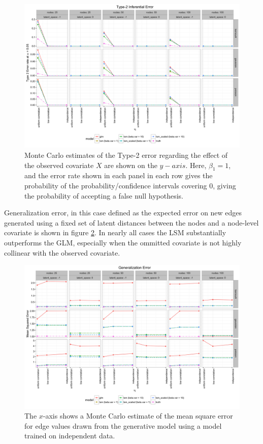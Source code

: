 \documentclass[12pt]{article}
\begin{document}
\begin{figure}
\includegraphics[width=\textwidth]{inference_type_2.png}
\caption{Monte Carlo estimates of the Type-2 error regarding the effect of the observed covariate $X$ are shown on the $y-axis$. Here, $\beta_1 = 1$, and the error rate shown in each panel in each row gives the probability of the probability/confidence intervals covering $0$, giving the probability of accepting a false null hypothesis. \label{fig:inference_type_2}}
\end{figure}

Generalization error, in this case defined as the expected error on new edges generated using a fixed set of latent distances between the nodes and a node-level covariate is shown in figure \ref{fig:generalization}. In nearly all cases the LSM substantially outperforms the GLM, especially when the ommitted covariate is not highly collinear with the observed covariate.

\begin{figure}
\includegraphics[width=\textwidth]{generalization.png}
\caption{The $x$-axis shows a Monte Carlo estimate of the mean square error for edge values drawn from the generative model using a model trained on independent data. \label{fig:generalization}}
\end{figure}
\end{document}
